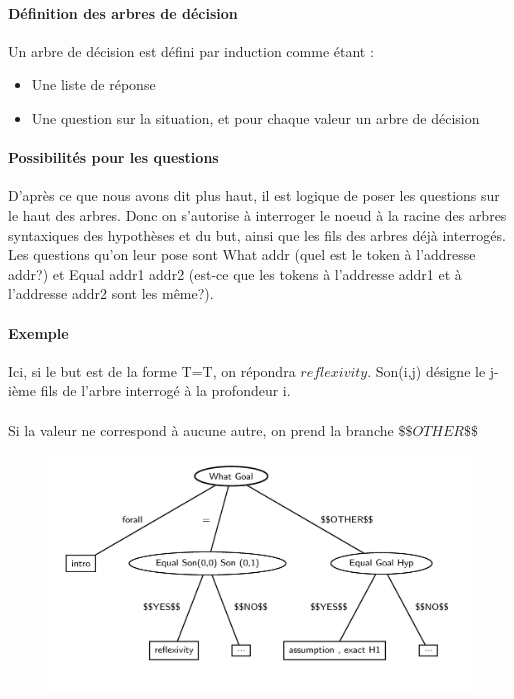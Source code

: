 \paragraph{Définition des arbres de décision}
Un arbre de décision est défini par induction comme étant :
\begin{itemize}
\item Une liste de réponse
\item Une question sur la situation, et pour chaque valeur un arbre de décision
\end{itemize}

\paragraph{Possibilités pour les questions}
D'après ce que nous avons dit plus haut, il est logique de poser les questions sur le haut des arbres. Donc on s'autorise à interroger le noeud à la racine des arbres syntaxiques des hypothèses et du but, ainsi que les fils des arbres déjà interrogés. Les questions qu'on leur pose sont What addr (quel est le token à l'addresse addr?) et Equal addr1 addr2 (est-ce que les tokens à l'addresse addr1 et à l'addresse addr2 sont les même?).


\paragraph{Exemple}
Ici, si le but est de la forme T=T, on répondra $reflexivity$. Son(i,j) désigne le j-ième fils de l'arbre interrogé à la profondeur i.

\paragraph{}
Si la valeur ne correspond à aucune autre, on prend la branche $\$\$OTHER\$\$$
\begin{figure}[h]
  \includegraphics[scale=1.7]{../images/apprentissage/decision_tree.jpg}
\end{figure}


